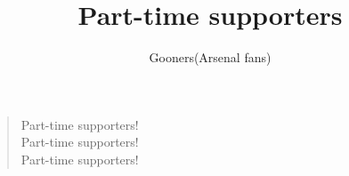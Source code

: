 \documentclass[a4paper,12pt]{article}
\title{Part-time supporters}
\author{Gooners(Arsenal fans)}
\date{}
\begin{document}
	
	\maketitle
	
	\begin{verse}
		
		Part-time supporters! \\
		Part-time supporters! \\
		Part-time supporters!
		
	\end{verse}
	
\end{document}
